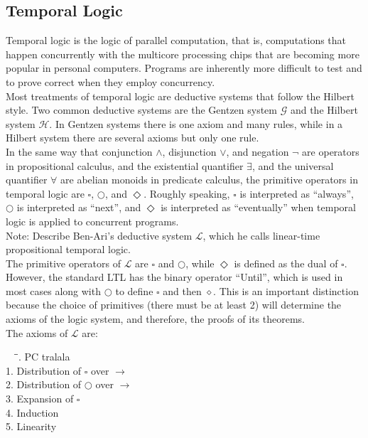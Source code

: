 \documentclass[fleqn, leqno]{article}
\newcommand{\lgap}{2pt}                             %
\newcommand{\all}{\forall}                          %
\newcommand{\ext}{\exists}                          %
\begin{document}
\subsection{Temporal Logic}

Temporal logic is the logic of parallel computation, that is, computations that happen concurrently
with the multicore processing chips that are becoming more popular in personal computers.
Programs are inherently more difficult to test and to prove correct when they employ concurrency.\\

Most treatments of temporal logic are deductive systems that follow the Hilbert style.
Two common deductive systems are the Gentzen system $\mathcal{G}$ and the Hilbert system $\mathcal{H}$. 
In Gentzen systems there is one axiom and many rules, while in a Hilbert system there are
several axioms but only one rule.\\

In the same way that conjunction $\land$, disjunction $\lor$, and negation $\neg$ are operators
in propositional calculus, and the existential quantifier $\ext$, and the universal quantifier $\all$
are abelian monoids in predicate calculus, the primitive operators in temporal logic are $\square$, $\bigcirc$,
and $\Diamond$. Roughly speaking, $\square$ is interpreted as ``always'', $\bigcirc$ is interpreted as ``next'',
and $\Diamond$ is interpreted as ``eventually'' when temporal logic is applied to concurrent programs. \cite{Ben2}\\

Note: Describe Ben-Ari's deductive system $\mathcal{L}$, which he calls linear-time propositional temporal logic.\\

The primitive operators of $\mathcal{L}$ are $\square$ and $\bigcirc$, while $\Diamond$ is defined as the dual of $\square$.  However, the standard LTL has the binary operator ``Until'', which is used in most cases along with $\bigcirc$ to define $\square$ and then $\diamond$.  This is an important distinction because the choice of primitives (there must be at least 2) will determine the axioms of the logic system, and therefore, the proofs of its theorems.\\

The axioms of $\mathcal{L}$ are:
\begin{tabbing}
$\quad\;$\=\hspace{3in}\=. \> PC \> tralala\\[\lgap]
1. \> Distribution of $\square$ over $\rightarrow$\\[\lgap]
2. \> Distribution of $\bigcirc$ over $\rightarrow$\\[\lgap]
3. \> Expansion of $\square$\\[\lgap]
4. \> Induction\\[\lgap]
5. \> Linearity\\[\lgap]
\end{tabbing}
\end{document}

